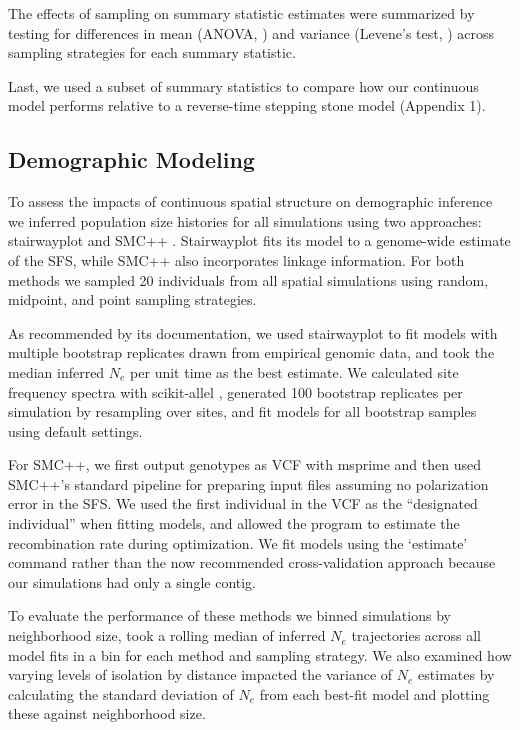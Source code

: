 \documentclass[10pt,twoside,lineno,hidelinks]{preprint}
\begin{document}
The effects of sampling on summary statistic estimates were summarized by testing for differences in mean (ANOVA, \citep{Rcore2018}) and variance (Levene's test, \citep{Fox2011}) across sampling strategies for each summary statistic. 

Last, we used a subset of summary statistics to compare how our continuous model performs relative to a reverse-time stepping stone model (Appendix 1). 


\subsection{Demographic Modeling}

To assess the impacts of continuous spatial structure on demographic inference we inferred population size histories for all simulations using two approaches: stairwayplot \citep{Liu2015} and SMC++ \citep{Terhorst2016}. Stairwayplot fits its model to a genome-wide estimate of the SFS, while SMC++ also incorporates linkage information. %
For both methods we sampled 20 individuals from all spatial simulations using random, midpoint, and point sampling strategies. 

As recommended by its documentation, we used stairwayplot to fit models with multiple bootstrap replicates drawn from empirical genomic data, and took the median inferred $N_{e}$ per unit time as the best estimate. We calculated site frequency spectra with scikit-allel \citep{Miles2017}, generated 100 bootstrap replicates per simulation by resampling over sites, and fit models for all bootstrap samples using default settings.

For SMC++, we first output genotypes as VCF with msprime and then used SMC++'s standard pipeline for preparing input files assuming no polarization error in the SFS. We used the first individual in the VCF as the ``designated individual'' when fitting models, and allowed the program to estimate the recombination rate during optimization. We fit models using the `estimate' command rather than the now recommended cross-validation approach because our simulations had only a single contig. 

To evaluate the performance of these methods we binned simulations by neighborhood size, took a rolling median of inferred $N_{e}$ trajectories across all model fits in a bin for each method and sampling strategy.  We also examined how varying levels of isolation by distance impacted the variance of $N_{e}$ estimates by calculating the standard deviation of $N_{e}$ from each best-fit model and plotting these against neighborhood size. 
\end{document}
